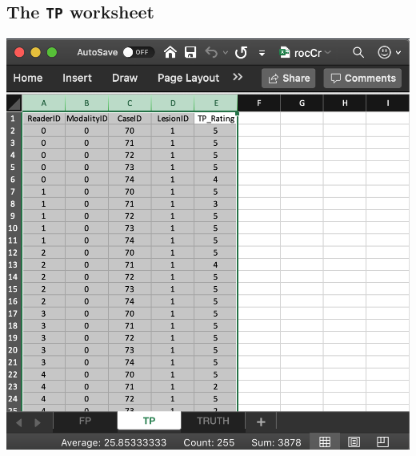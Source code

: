 \documentclass[
]{book}
\begin{document}
\hypertarget{dataset-object-details-read-datafile-correspondence-ll-tp}{%
\subsection{\texorpdfstring{The \texttt{TP} worksheet}{The TP worksheet}}\label{dataset-object-details-read-datafile-correspondence-ll-tp}}

\includegraphics[width=1\textwidth,height=\textheight]{images/quick-start/rocCrTp.png}
\end{document}
